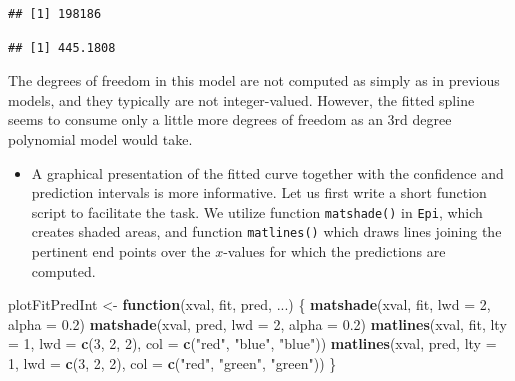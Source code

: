 \documentclass[
]{book}
\newenvironment{Shaded}{\begin{snugshade}}{\end{snugshade}}
\newcommand{\AttributeTok}[1]{\textcolor[rgb]{0.13,0.29,0.53}{#1}}
\newcommand{\ControlFlowTok}[1]{\textcolor[rgb]{0.13,0.29,0.53}{\textbf{#1}}}
\newcommand{\DecValTok}[1]{\textcolor[rgb]{0.00,0.00,0.81}{#1}}
\newcommand{\FloatTok}[1]{\textcolor[rgb]{0.00,0.00,0.81}{#1}}
\newcommand{\FunctionTok}[1]{\textcolor[rgb]{0.13,0.29,0.53}{\textbf{#1}}}
\newcommand{\NormalTok}[1]{#1}
\newcommand{\OtherTok}[1]{\textcolor[rgb]{0.56,0.35,0.01}{#1}}
\newcommand{\SpecialCharTok}[1]{\textcolor[rgb]{0.81,0.36,0.00}{\textbf{#1}}}
\newcommand{\StringTok}[1]{\textcolor[rgb]{0.31,0.60,0.02}{#1}}
\providecommand{\tightlist}{%
  \setlength{\itemsep}{0pt}\setlength{\parskip}{0pt}}
\begin{document}
\begin{Shaded}
\end{Shaded}

\begin{verbatim}
## [1] 198186
\end{verbatim}

\begin{Shaded}
\end{Shaded}

\begin{verbatim}
## [1] 445.1808
\end{verbatim}

The degrees of freedom in this model are not computed as simply as in previous
models, and they typically are not integer-valued. However,
the fitted spline seems to consume only a little more degrees of freedom
as an 3rd degree polynomial model would take.

\begin{itemize}
\tightlist
\item
  A graphical presentation of the fitted curve together with the
  confidence and prediction intervals is more informative.
  Let us first write a
  short function script to facilitate the task. We utilize function \texttt{matshade()}
  in \texttt{Epi}, which creates shaded areas, and function \texttt{matlines()} which draws
  lines joining the pertinent end points over the \(x\)-values for which the
  predictions are computed.
\end{itemize}

\begin{Shaded}
\begin{Highlighting}[]
\NormalTok{plotFitPredInt }\OtherTok{\textless{}{-}} \ControlFlowTok{function}\NormalTok{(xval, fit, pred, ...) \{}
  \FunctionTok{matshade}\NormalTok{(xval, fit, }\AttributeTok{lwd =} \DecValTok{2}\NormalTok{, }\AttributeTok{alpha =} \FloatTok{0.2}\NormalTok{)}
  \FunctionTok{matshade}\NormalTok{(xval, pred, }\AttributeTok{lwd =} \DecValTok{2}\NormalTok{, }\AttributeTok{alpha =} \FloatTok{0.2}\NormalTok{)}
  \FunctionTok{matlines}\NormalTok{(xval, fit, }\AttributeTok{lty =} \DecValTok{1}\NormalTok{, }\AttributeTok{lwd =} \FunctionTok{c}\NormalTok{(}\DecValTok{3}\NormalTok{, }\DecValTok{2}\NormalTok{, }\DecValTok{2}\NormalTok{), }\AttributeTok{col =} \FunctionTok{c}\NormalTok{(}\StringTok{"red"}\NormalTok{, }\StringTok{"blue"}\NormalTok{, }\StringTok{"blue"}\NormalTok{))}
  \FunctionTok{matlines}\NormalTok{(xval, pred, }\AttributeTok{lty =} \DecValTok{1}\NormalTok{, }\AttributeTok{lwd =} \FunctionTok{c}\NormalTok{(}\DecValTok{3}\NormalTok{, }\DecValTok{2}\NormalTok{, }\DecValTok{2}\NormalTok{), }\AttributeTok{col =} \FunctionTok{c}\NormalTok{(}\StringTok{"red"}\NormalTok{, }\StringTok{"green"}\NormalTok{, }\StringTok{"green"}\NormalTok{))}
\NormalTok{\}}
\end{Highlighting}
\end{Shaded}
\end{document}
